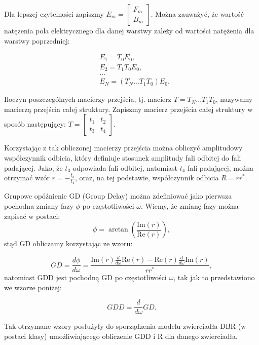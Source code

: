 Dla lepszej czytelności zapiszmy $E_m =     \left[
    \begin{array}{c}
    F_{m} \\ B_{m}
    \end{array}
    \right]$.
Można zauważyć, że wartość natężenia pola elektrycznego dla danej warstwy zależy od wartości natężenia dla warstwy poprzedniej:
    
\begin{align*}
    &E_1 = T_0 E_0, \\
    &E_2 = T_1 T_0 E_0, \\
    &... \\
    &E_N = (T_N ... T_1 T_0) E_0.
\end{align*}

Iloczyn poszczególnych macierzy przejścia, tj. macierz $T = T_N ... T_1 T_0$, nazywamy macierzą przejścia całej struktury.
Zapiszmy macierz przejścia całej struktury w sposób następujący:
$T = \left[
\begin{array}{cc}
   t_1  & t_2 \\
   t_3  & t_4
\end{array}
\right]$.

Korzystając z tak obliczonej macierzy przejścia można obliczyć amplitudowy współczynnik odbicia, który definiuje stosunek amplitudy fali odbitej do fali padającej. Jako, że $t_3$ odpowiada fali odbitej, natomiast $t_4$ fali padającej, można otrzymać wzór $r=-\frac{t_3}{t_4}$,
oraz, na tej podstawie, współczynnik odbicia $R = rr^*$.

Grupowe opóźnienie GD (Group Delay) można zdefiniować jako pierwsza pochodna zmiany fazy $\phi$ po częstotliwości $\omega$. Wiemy, że zmianę fazy można zapisać w postaci:
\begin{equation}
    \phi = \arctan\left(\frac{\mathrm{Im}(r)}{\mathrm{Re}(r)}\right),
\end{equation}
stąd GD obliczamy korzystając ze wzoru:

\begin{equation}
    GD = \frac{d\phi}{d\omega} = \frac{\mathrm{Im}(r) \frac{d}{d\omega}\mathrm{Re}(r) - \mathrm{Re}(r) \frac{d}{d\omega}\mathrm{Im}(r)}{rr^*} ,
\end{equation}
natomiast GDD jest pochodną GD po częstotliwości $\omega$, tak jak to przedstawiono we wzorze poniżej:

\begin{equation}
    GDD = \frac{d}{d\omega} GD.
\end{equation}

Tak otrzymane wzory posłużyły do sporządzenia modelu zwierciadła DBR (w postaci klasy) umożliwiającego obliczenie GDD i R dla danego zwierciadła. %